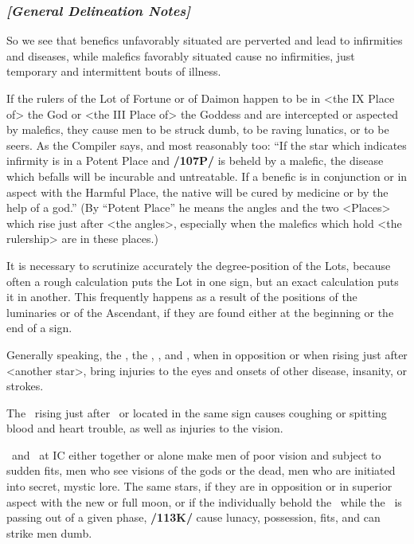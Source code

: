 \subsubsection{\textit{[General Delineation Notes]}}
So we see that benefics unfavorably situated are perverted \mnbm and lead to infirmities and diseases, while malefics favorably situated cause no infirmities, just temporary and intermittent bouts of illness. 

If the rulers of the Lot of Fortune or of Daimon happen to be in <the IX Place of> the God or <the III Place of> the Goddess and are intercepted or aspected by malefics, they cause men to be struck dumb, to be raving lunatics, or to be seers. As the Compiler says, and most reasonably too: “If the star which indicates infirmity is in a Potent Place and \textbf{/107P/} is beheld by a malefic, the disease which befalls will be incurable and untreatable. If a benefic is in conjunction or in aspect with the Harmful Place, the native will be cured by medicine or by the help of a god.” (By “Potent Place” he means the angles and the two <Places> which rise just after <the angles>, especially when the malefics which hold <the rulership> are in these places.) 

It is necessary to scrutinize accurately the degree-position of the Lots, because often a rough calculation puts the Lot in one sign, but an exact calculation puts it in another. This frequently happens as a result of the positions of the luminaries or of the Ascendant, if they are found either at the beginning or the end of a sign. 

Generally speaking, the \Sun, the \Moon, \Saturn, and \Mercury, when in opposition or when rising just after <another star>, bring injuries to the eyes and onsets of other disease, insanity, or strokes. 

The \Sun\, rising just after \Mars\, or located in the same sign causes coughing or spitting blood and heart trouble, as well as injuries to the vision. 

\Saturn\, and \Mars\, at IC either together or alone make men of poor vision and subject to sudden fits, men who see visions of the gods or the dead, men who are initiated into secret, mystic lore. The same stars, if they are in opposition or in superior aspect with the new or full moon, or if the individually behold the \Moon\, while the \Moon\, is passing out of a given phase, \textbf{/113K/} cause lunacy,
possession, fits, and can strike men dumb.

